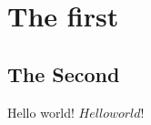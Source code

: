 \documentclass[12pt]{article}
\begin{document}
\section{The first}
\subsection{The Second}
Hello world!
$Hello world!$ %
\end{document}

